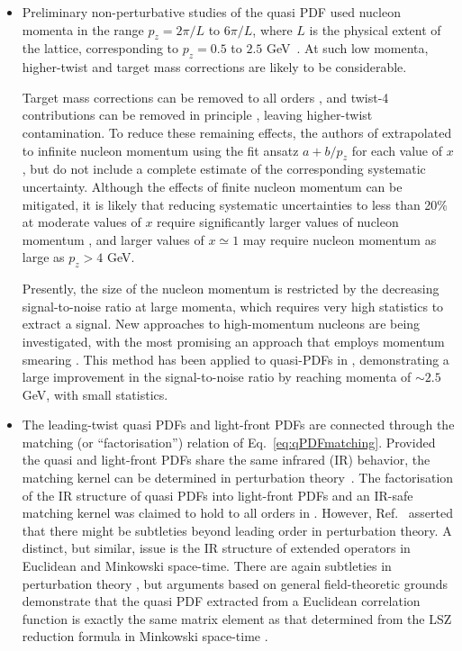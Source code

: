 \begin{itemize}
 \item Preliminary non-perturbative studies of the quasi PDF used nucleon momenta in the range $p_z = 2\pi/L$ to $6\pi/L$, where $L$ is the physical extent of the lattice, corresponding to $p_z = 0.5$ to $2.5$ GeV~\cite{Lin:2014zya,Alexandrou:2015rja,Chen:2016utp,Alexandrou:2016jqi}. At such low momenta, higher-twist and target mass corrections are likely to be considerable.

Target mass corrections can be removed to all orders \cite{Chen:2016utp}, and twist-4 contributions can be removed in principle \cite{Radyushkin:2016hsy,Chen:2016utp}, leaving higher-twist contamination. To reduce these remaining effects, the authors of \cite{Lin:2014zya,Chen:2016utp} extrapolated to infinite nucleon momentum using the fit ansatz $a + b/p_z$ for each value of $x$, but do not include a complete estimate of the corresponding systematic uncertainty. Although the effects of finite nucleon momentum can be mitigated, it is likely that reducing systematic uncertainties to less than 20\% at moderate values of $x$ require significantly larger values of nucleon momentum \cite{Gamberg:2014zwa}, and larger values of $x\simeq 1$ may require nucleon momentum as large as $p_z > 4$ GeV.

Presently, the size of the nucleon momentum is restricted by the decreasing signal-to-noise ratio at large momenta, which requires very high statistics to extract a signal. New approaches to high-momentum nucleons are being investigated, with the most promising an approach that employs momentum smearing \cite{Bali:2016lva}. This method has been applied to quasi-PDFs in \cite{Alexandrou:2016jqi}, demonstrating a large improvement in the signal-to-noise ratio by reaching momenta of $\sim 2.5$ GeV, with small statistics.

\item The leading-twist quasi PDFs and light-front PDFs are connected through the matching (or ``factorisation'') relation of Eq.~\eqref{eq:qPDFmatching}. Provided the quasi and light-front PDFs share the same infrared (IR) behavior, the matching kernel can be determined in perturbation theory~\cite{Xiong:2013bka}. The factorisation of the IR structure of quasi PDFs into light-front PDFs and an IR-safe matching kernel was claimed to hold to all orders in \cite{Ma:2014jla, Ma:2014jga}. However, Ref.~\cite{Li:2016amo} asserted that there might be subtleties beyond leading order in perturbation theory. A distinct, but similar, issue is the IR structure of extended operators in Euclidean and Minkowski space-time. There are again subtleties in perturbation theory \cite{Carlson:2017gpk}, but arguments based on general field-theoretic grounds demonstrate that the quasi PDF extracted from a Euclidean correlation function is exactly the same matrix element as that determined from the LSZ reduction formula in Minkowski space-time \cite{Briceno:2017cpo}.


\end{itemize}
